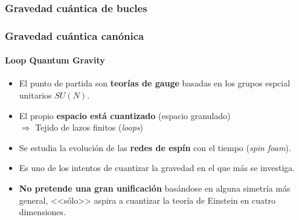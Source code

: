 \documentclass{beamer}
\begin{document}
\subsubsection{Gravedad cuántica de bucles}
\begin{frame}
\frametitle{Gravedad cuántica canónica}
\framesubtitle{Loop Quantum Gravity}
\begin{itemize}
 \item El punto de partida son \textbf{teorías de gauge} basadas en los grupos espcial unitarios $SU(N)$.
 \item El propio \textbf{espacio está cuantizado} (espacio granulado)\\$\Rightarrow$ Tejido de lazos finitos (\emph{loops})
 \item Se estudia la evolución de las \textbf{redes de espín} con el tiempo (\emph{spin foam}).
 \item Es uno de los intentos de cuantizar la gravedad en el que más se investiga.
 \item \textbf{No pretende una gran unificación} basándose en alguna simetría más general, <<sólo>> aspira a cuantizar la teoría de Einstein en cuatro dimensiones.
\end{itemize}
\end{frame}
%
%
\end{document}
